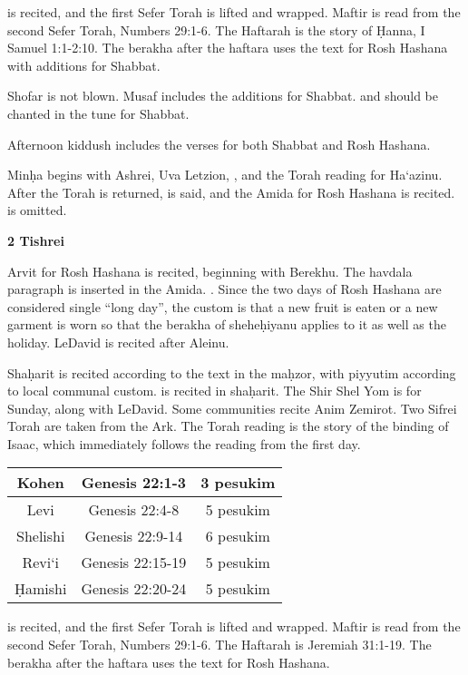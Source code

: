 {\halfkad is recited, and the first Sefer Torah is lifted and wrapped. Maftir is read from the second Sefer Torah, Numbers 29:1-6.  The Haftarah is the story of \d{H}anna, I Samuel 1:1-2:10. The berakha after the haftara uses the text for Rosh Hashana with additions for Shabbat.

Shofar is not blown.  Musaf includes the additions for Shabbat.  \space and \space should be chanted in the tune for Shabbat.

Afternoon kiddush includes the verses for both Shabbat and Rosh Hashana.

Min\d{h}a begins with Ashrei, Uva Letzion, \halfkad, and the Torah reading for Ha`azinu. After the Torah is returned, \halfkad is said, and the Amida for Rosh Hashana is recited. \space is omitted.

\textbf{2 Tishrei}

Arvit for Rosh Hashana is recited, beginning with Berekhu.  The havdala paragraph is inserted in the Amida.  \yakenhaz . Since the two days of Rosh Hashana are considered single ``long day'', the custom is that a new fruit is eaten or a new garment is worn so that the berakha of shehe\d{h}iyanu applies to it as well as the holiday. LeDavid is recited after Aleinu.

Sha\d{h}arit is recited according to the text in the ma\d{h}zor, with piyyutim according to local communal custom.  is recited in sha\d{h}arit. The Shir Shel Yom is for Sunday, along with LeDavid.  Some communities recite Anim Zemirot.  Two Sifrei Torah are taken from the Ark.  The Torah reading is the story of the binding of Isaac, which immediately follows the reading from the first day.

\begin{tabular}{c | c | c}
	Kohen &Genesis 22:1-3 & 3 pesukim\\\hline
	Levi &Genesis 22:4-8 & 5 pesukim\\\hline
	Shelishi & Genesis 22:9-14 & 6 pesukim\\\hline
	Revi`i &Genesis 22:15-19 & 5 pesukim\\\hline
	\d{H}amishi &Genesis 22:20-24 &5 pesukim\\
\end{tabular}

\halfkad is recited, and the first Sefer Torah is lifted and wrapped. Maftir is read from the second Sefer Torah, Numbers 29:1-6.  The Haftarah is Jeremiah 31:1-19. The berakha after the haftara uses the text for Rosh Hashana.

}
